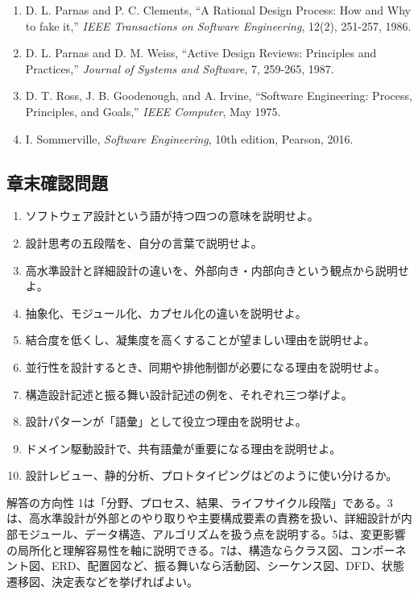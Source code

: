 \documentclass[a4paper,11pt]{ltjsarticle}
\numberwithin{figure}{section}
\numberwithin{table}{section}
\begin{document}
\begin{enumerate}
  \item D. L. Parnas and P. C. Clements, “A Rational Design Process: How and Why to fake it,” \textit{IEEE Transactions on Software Engineering}, 12(2), 251-257, 1986.
  \item D. L. Parnas and D. M. Weiss, “Active Design Reviews: Principles and Practices,” \textit{Journal of Systems and Software}, 7, 259-265, 1987.
  \item D. T. Ross, J. B. Goodenough, and A. Irvine, “Software Engineering: Process, Principles, and Goals,” \textit{IEEE Computer}, May 1975.
  \item I. Sommerville, \textit{Software Engineering}, 10th edition, Pearson, 2016.
\end{enumerate}

\subsection{章末確認問題}

\begin{enumerate}
  \item ソフトウェア設計という語が持つ四つの意味を説明せよ。
  \item 設計思考の五段階を、自分の言葉で説明せよ。
  \item 高水準設計と詳細設計の違いを、外部向き・内部向きという観点から説明せよ。
  \item 抽象化、モジュール化、カプセル化の違いを説明せよ。
  \item 結合度を低くし、凝集度を高くすることが望ましい理由を説明せよ。
  \item 並行性を設計するとき、同期や排他制御が必要になる理由を説明せよ。
  \item 構造設計記述と振る舞い設計記述の例を、それぞれ三つ挙げよ。
  \item 設計パターンが「語彙」として役立つ理由を説明せよ。
  \item ドメイン駆動設計で、共有語彙が重要になる理由を説明せよ。
  \item 設計レビュー、静的分析、プロトタイピングはどのように使い分けるか。
\end{enumerate}

\begin{pointbox}{解答の方向性}
1は「分野、プロセス、結果、ライフサイクル段階」である。3は、高水準設計が外部とのやり取りや主要構成要素の責務を扱い、詳細設計が内部モジュール、データ構造、アルゴリズムを扱う点を説明する。5は、変更影響の局所化と理解容易性を軸に説明できる。7は、構造ならクラス図、コンポーネント図、ERD、配置図など、振る舞いなら活動図、シーケンス図、DFD、状態遷移図、決定表などを挙げればよい。
\end{pointbox}
\end{document}
